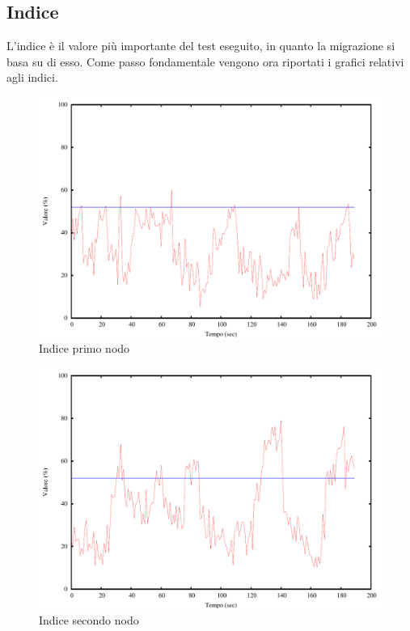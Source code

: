 \subsection{Indice}
L'indice è il valore più importante del test eseguito, in quanto la migrazione si basa su di esso. Come passo fondamentale vengono ora riportati i grafici relativi agli indici.
\begin{figure}[H]
\begin{center}
\includegraphics[scale=0.6]{etc/index1.pdf}
\caption{Indice primo nodo}
\label{fig:index1}
\end{center}
\end{figure}
\begin{figure}[H]
\begin{center}
\includegraphics[scale=0.6]{etc/index2.pdf}
\caption{Indice secondo nodo}
\label{fig:index2}
\end{center}
\end{figure}
